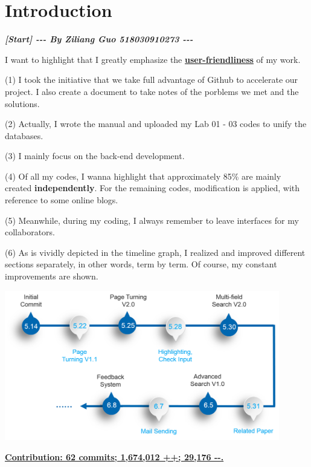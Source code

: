 \documentclass[10pt,twoside,a4paper,titlepage]{article}
\begin{document}
	\section{Introduction}
		\textbf{\emph{[Start] -{}-{}- By Ziliang Guo 518030910273 -{}-{}-}}\newline\par
		I want to highlight that I greatly emphasize the \textbf{\underline{user-friendliness}} of my work.\par
		(1) I took the initiative that we take full advantage of Github to accelerate our project. I also create a document to take notes of the porblems we met and the solutions.\newline\par
		(2) Actually, I wrote the manual and uploaded my Lab 01 - 03 codes to unify the databases.\newline\par
		(3)	I mainly focus on the back-end development.\newline\par
		(4) Of all my codes, I wanna highlight that approximately 85\% are mainly created \textbf{independently}. For the remaining codes, modification is applied, with reference to some online blogs.\newline\par
		(5) Meanwhile, during my coding, I always remember to leave interfaces for my collaborators.\newline\par
		(6)	As is vividly depicted in the timeline graph, I realized and improved different sections separately, in other words, term by term. Of course, my constant improvements are shown.\newline\par
		\includegraphics[width=0.9\textwidth]{gzl/01.png}\newline\par
		\underline{\textbf{Contribution: 62 commits; 1,674,012 ++; 29,176 -{}-.}}
\end{document}
